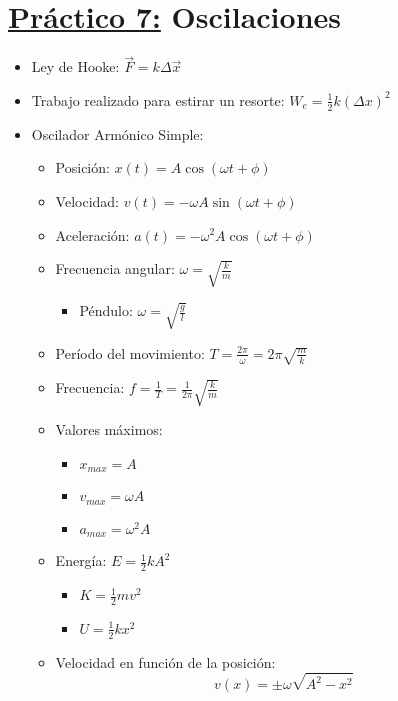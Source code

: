 \documentclass[12pt,a4paper]{article}
\begin{document}
	\section*{\underline{Práctico 7:} Oscilaciones}
		\begin{itemize}
			\item Ley de Hooke: $\vec{F} = k \Delta \vec{x}$
			\item Trabajo realizado para estirar un resorte: $W_{e} = \frac{1}{2} k (\Delta x)^{2}$
			\item Oscilador Armónico Simple:
				\begin{multicols}{2}
					\begin{itemize}
						\item Posición: $x(t) = A \cos (\omega t + \phi)$
						\item Velocidad: $v(t) = - \omega A \sin (\omega t + \phi)$
						\item Aceleración: $a(t) = - \omega^{2} A \cos (\omega t + \phi)$
						\item Frecuencia angular: $\omega = \sqrt{\frac{k}{m}}$
							\begin{itemize}
								\item Péndulo: $\omega = \sqrt{\frac{g}{l}}$
							\end{itemize}
						\item Período del movimiento: $T = \frac{2\pi}{\omega} = 2\pi \sqrt{\frac{m}{k}}$
						\item Frecuencia: $f = \frac{1}{T} = \frac{1}{2\pi} \sqrt{\frac{k}{m}}$
						\item Valores máximos:
							\begin{itemize}
								\item $x_{max} = A$
								\item $v_{max} = \omega A$
								\item $a_{max} = \omega^{2}A$
							\end{itemize}
						\item Energía: $E = \frac{1}{2} k A^{2}$
							\begin{multicols}{2}
								\begin{itemize}
									\item $K = \frac{1}{2} m v^{2}$
									\item $U = \frac{1}{2} k x^{2}$
								\end{itemize}
							\end{multicols}
						\item Velocidad en función de la posición:
							\[
								v(x) = \pm \omega \sqrt{A^{2} - x^{2}}
\]
\end{itemize}
\end{multicols}
\end{itemize}
\end{document}
